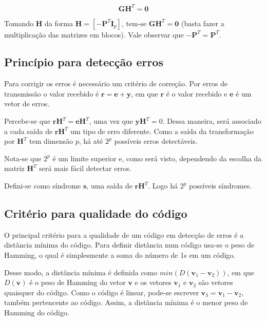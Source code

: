 \begin{equation}
	\textbf{G}\textbf{H}^T =\textbf{0}
	\label{fundamental}
\end{equation}

Tomando $\textbf{H}$ da forma $\textbf{H} = [-\textbf{P}^T\textbf{I}_p]$, tem-se $\textbf{G}\textbf{H}^T = \textbf{0}$ (basta fazer a multiplicação das matrizes em blocos). Vale observar que $-\textbf{P}^T = \textbf{P}^T$.

\subsection{Princípio para detecção erros}

Para corrigir os erros é necessário um critério de correção. Por erros de transmissão o valor recebido é $\textbf{r} = \textbf{e}+\textbf{y}$, em que $\textbf{r}$ é o valor recebido e $\textbf{e}$ é um vetor de erros. 

Percebe-se que $\textbf{r}\textbf{H}^T = \textbf{e}\textbf{H}^T$, uma vez que $\textbf{y}\textbf{H}^T = 0$. Dessa maneira, será associado a cada saída de $\textbf{r}\textbf{H}^T$ um tipo de erro diferente. Como a saída da transformação por $\textbf{H}^T$ tem dimensão $p$, há até $2^p$ possíveis erros detectáveis.

Nota-se que $2^p$ é um limite superior e, como será visto, dependendo da escolha da matriz $\textbf{H}^T$ será mais fácil detectar erros.

Defini-se como síndrome $\textbf{s}$, uma saída de $\textbf{r}\textbf{H}^T$. Logo há $2^p$ possíveis síndromes.

\subsection{Critério para qualidade do código}

O principal critério para a qualidade de um código em detecção de erros é a distância mínima do código. Para definir distância num código usa-se o peso de Hamming, o qual é simplesmente a soma do número de 1s em um código.

Desse modo, a distância mínima é definida como $min(D(\textbf{v}_1-\textbf{v}_2))$, em que $D(\textbf{v})$ é o peso de Hamming do vetor $\textbf{v}$ e os vetores $\textbf{v}_1$ e $\textbf{v}_2$ são vetores quaisquer do código. Como o código é linear, pode-se escrever $\textbf{v}_3 = \textbf{v}_1-\textbf{v}_2$, também pertencente ao código. Assim, a distância mínima é o menor peso de Hamming do código.

